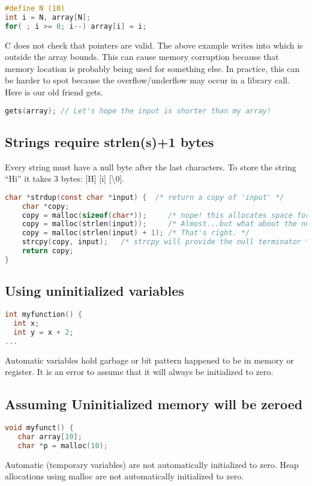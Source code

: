 \begin{lstlisting}[language=C]
#define N (10)
int i = N, array[N];
for( ; i >= 0; i--) array[i] = i;
\end{lstlisting}

C does not check that pointers are valid. The above example writes into  which is outside the array bounds. This can cause memory corruption because that memory location is probably being used for something else.
In practice, this can be harder to spot because the overflow/underflow may occur in a library call.
Here is our old friend gets.

\begin{lstlisting}[language=C]
gets(array); // Let's hope the input is shorter than my array!
\end{lstlisting}


\subsection{Strings require strlen(s)+1 bytes}

Every string must have a null byte after the last characters. To store
the string ``Hi'' it takes 3 bytes: [H] [i] [\backslash 0].

\begin{lstlisting}[language=C]
  char *strdup(const char *input) {  /* return a copy of 'input' */
    char *copy;
    copy = malloc(sizeof(char*));     /* nope! this allocates space for a pointer, not a string */
    copy = malloc(strlen(input));     /* Almost...but what about the null terminator? */
    copy = malloc(strlen(input) + 1); /* That's right. */
    strcpy(copy, input);   /* strcpy will provide the null terminator */
    return copy;
}
\end{lstlisting}

\subsection{Using uninitialized variables}

\begin{lstlisting}[language=C]
int myfunction() {
  int x;
  int y = x + 2;
...
\end{lstlisting}

Automatic variables hold garbage or bit pattern happened to be in memory or register.
It is an error to assume that it will always be initialized to zero.

\subsection{Assuming Uninitialized memory will be zeroed}

\begin{lstlisting}[language=C]
void myfunct() {
   char array[10];
   char *p = malloc(10);
\end{lstlisting}

Automatic (temporary variables) are not automatically initialized to zero.
Heap allocations using malloc are not automatically initialized to zero.


